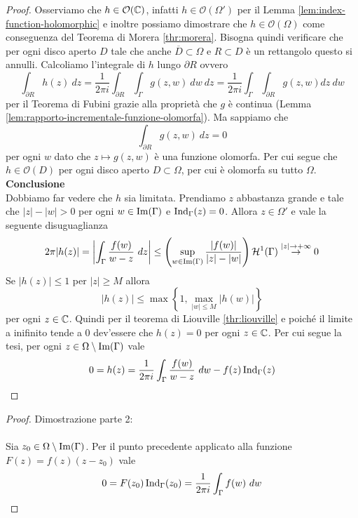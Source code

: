 \begin{proof}
    Osserviamo che $h \in \mathcal{O}(\mathbb{C})$, infatti $h \in
    \mathcal{O}(\Omega')$ per il Lemma \ref{lem:index-function-holomorphic}
    e inoltre possiamo dimostrare che $h \in \mathcal{O}(\Omega)$ come
    conseguenza del Teorema di Morera \ref{thr:morera}. 
    Bisogna quindi verificare che per ogni disco aperto $D$ tale che anche 
    $\overline{D}\subset \Omega$ e $R \subset D$ è un rettangolo questo si
    annulli. Calcoliamo l'integrale di $h$ lungo $\partial R$ ovvero 
    \begin{equation*}
      \int_{\partial R} h(z)\ dz = \frac{1}{2\pi i} \int_{\partial
      R}\int_\Gamma g(z,w)\ dw\ dz = \frac{1}{2\pi i} \int_\Gamma
      \int_{\partial R} g(z,w) dz\ dw
    \end{equation*}
    per il Teorema di Fubini grazie alla proprietà che $g$ è continua (Lemma
    \ref{lem:rapporto-incrementale-funzione-olomorfa}). Ma sappiamo che 
    \begin{equation*}
      \int_{\partial R} g(z,w) \ dz = 0  
    \end{equation*}
    per ogni $w$ dato che $z \mapsto g(z,w)$ è una funzione olomorfa. Per
    cui segue che $h \in \mathcal{O}(D)$ per ogni disco aperto $D \subset
    \Omega$, per cui è olomorfa su tutto $\Omega$.\\

    \textbf{Conclusione}\\

    Dobbiamo far vedere che $h$ sia limitata. Prendiamo $z$ abbastanza
    grande e tale che $|z| - |w| > 0$ per ogni $w \in \operatorname{Im}(\Gamma)$
    e $\operatorname{Ind}_\Gamma(z) = 0$. Allora $z \in \Omega'$ e vale la
    seguente disuguaglianza
    \begin{equation*}
      2\pi |h(z)| = \left|\int_\Gamma \frac{f(w)}{w-z}\ dz \right| \le
      \left( \sup_{w \in \operatorname{Im}(\Gamma)} \frac{|f(w)|}{|z|-|w|} \right)
        \mathcal{H}^1(\Gamma) \overset{|z|\to+\infty}{\to} 0
    \end{equation*}
    Se $|h(z)| \le 1$ per $|z| \ge M$ allora 
    \begin{equation*}
      |h(z)| \le \max \left\{1,\max_{|w| \le M} |h(w)|\right\}
    \end{equation*}
    per ogni $z \in \mathbb{C}$. Quindi per il teorema di Liouville
    \ref{thr:liouville} e poiché il limite a inifinito tende a $0$
    dev'essere che $h(z) = 0$ per ogni $z \in \mathbb{C}$. Per cui segue la tesi, 
    per ogni $z \in \Omega \setminus \operatorname{Im}(\Gamma)$ vale 
    \begin{equation*}
      0 = h(z) = \frac{1}{2 \pi i} \int_\Gamma \frac{f(w)}{w-z}\ dw - f(z)
      \operatorname{Ind}_\Gamma(z)  
    \end{equation*}
\end{proof}
\begin{proof}Dimostrazione parte 2: \\ \\
  Sia $z_0 \in \Omega \setminus \operatorname{Im}(\Gamma)$. Per il punto precedente
    applicato alla funzione $F(z) = f(z)(z-z_0)$ vale
    \begin{equation*}
      0 = F(z_0)\operatorname{Ind}_\Gamma(z_0) = \frac{1}{2 \pi i}
      \int_\Gamma f(w)\ dw
    \end{equation*}
\end{proof}

